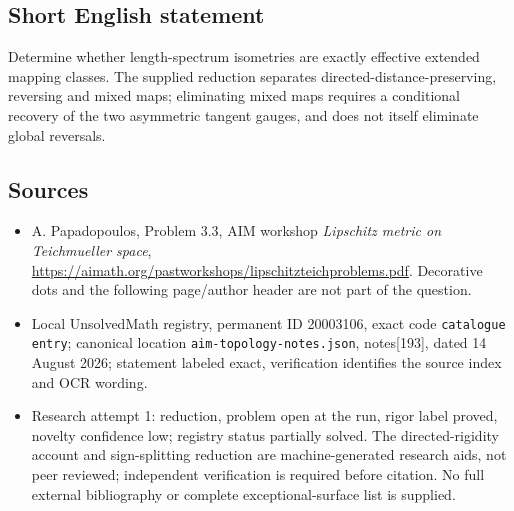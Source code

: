 \documentclass[11pt]{article}
\begin{document}
\subsection{Short English statement}
Determine whether length-spectrum isometries are exactly effective extended mapping classes. The supplied reduction separates directed-distance-preserving, reversing and mixed maps; eliminating mixed maps requires a conditional recovery of the two asymmetric tangent gauges, and does not itself eliminate global reversals.
\subsection{Sources}
\begin{itemize}
\item A. Papadopoulos, Problem 3.3, AIM workshop \emph{Lipschitz metric on Teichmueller space}, \url{https://aimath.org/pastworkshops/lipschitzteichproblems.pdf}. Decorative dots and the following page/author header are not part of the question.
\item Local UnsolvedMath registry, permanent ID 20003106, exact code \texttt{catalogue entry}; canonical location \texttt{aim-topology-notes.json}, notes[193], dated 14 August 2026; statement labeled exact, verification identifies the source index and OCR wording.
\item Research attempt 1: reduction, problem open at the run, rigor label proved, novelty confidence low; registry status partially solved. The directed-rigidity account and sign-splitting reduction are machine-generated research aids, not peer reviewed; independent verification is required before citation. No full external bibliography or complete exceptional-surface list is supplied.
\end{itemize}
\end{document}
